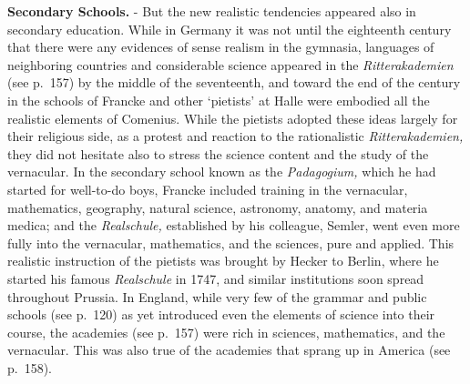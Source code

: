 \documentclass[]{book}
\begin{document}
\textbf{Secondary Schools.} - But the new realistic tendencies appeared also in secondary education. While in Germany it was not until the eighteenth century that there were any evidences of sense realism in the gymnasia, languages of neighboring countries and considerable science appeared in the \emph{Ritterakademien} (see p.~157) by the middle of the seventeenth, and toward the end of the century in the schools of Francke and other `pietists' at Halle were embodied all the realistic elements of Comenius. While the pietists adopted these ideas largely for their religious side, as a protest and reaction to the rationalistic \emph{Ritterakademien,} they did not hesitate also to stress the science content and the study of the vernacular. In the secondary school known as the \emph{Padagogium,} which he had started for well-to-do boys, Francke included training in the vernacular, mathematics, geography, natural science, astronomy, anatomy, and materia medica; and the \emph{Realschule,} established by his colleague, Semler, went even more fully into the vernacular, mathematics, and the sciences, pure and applied. This realistic instruction of the pietists was brought by Hecker to Berlin, where he started his famous \emph{Realschule} in 1747, and similar institutions soon spread throughout Prussia. In England, while very few of the grammar and public schools (see p.~120) as yet introduced even the elements of science into their course, the academies (see p.~157) were rich in sciences, mathematics, and the vernacular. This was also true of the academies that sprang up in America (see p.~158).
\end{document}
